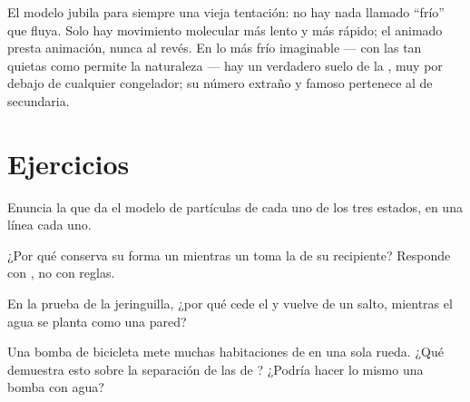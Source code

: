 \begin{example}\label{ex:g7:states-of-matter:cold}
El modelo jubila para siempre una vieja tentación: no hay nada llamado
``frío'' que fluya. Solo hay movimiento molecular más lento y más
rápido; el animado presta animación, nunca al revés. En lo más frío
imaginable --- con las  tan quietas como permite la
naturaleza --- hay un verdadero suelo de la , muy por
debajo de cualquier congelador; su número extraño y famoso pertenece
al  de secundaria.
\end{example}

\section{Ejercicios}

\begin{exercise}[$\star$]\label{exo:g7:states-of-matter:1}
Enuncia la  que da el modelo de partículas de cada uno de los
tres estados, en una línea cada uno.
\end{exercise}

\begin{exercise}[$\star$]\label{exo:g7:states-of-matter:2}
¿Por qué conserva su forma un  mientras un  toma la
de su recipiente? Responde con , no con reglas.
\end{exercise}

\begin{exercise}[$\star$]\label{exo:g7:states-of-matter:3}
En la prueba de la jeringuilla, ¿por qué cede el  y vuelve de un
salto, mientras el agua se planta como una pared?
\end{exercise}

\begin{exercise}[$\star$]\label{exo:g7:states-of-matter:4}
Una bomba de bicicleta mete muchas habitaciones de  en una sola
rueda. ¿Qué demuestra esto sobre la separación de las
 de ? ¿Podría hacer lo mismo una bomba con agua?
\end{exercise}

